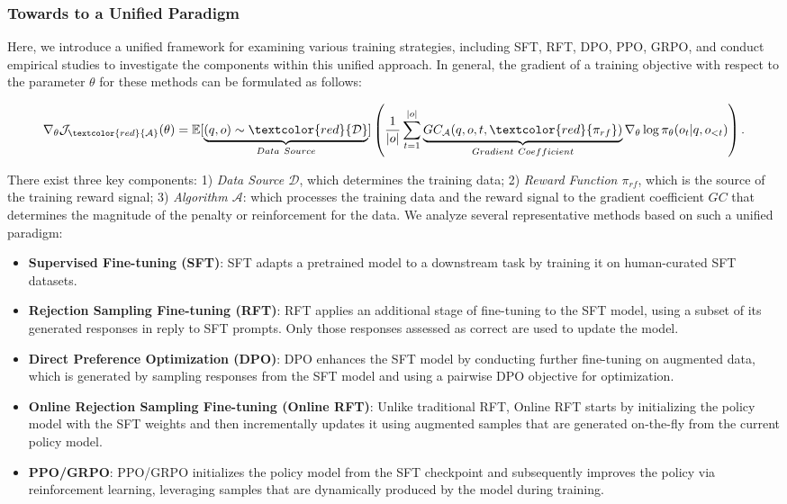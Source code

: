 \begin{itemize}[topsep=0pt]
\begin{itemize}[topsep=0pt]
\subsubsection{Towards to a Unified Paradigm} Here, we introduce a unified framework for examining various training strategies, including SFT, RFT, DPO, PPO, GRPO, and conduct empirical studies to investigate the components within this unified approach. In general, the gradient of a training objective with respect to the parameter $\theta$ for these methods can be formulated as follows:

\begin{equation}
    \nabla_{\theta}\mathcal{J}_{\textcolor{red}{\mathcal{A}}}(\theta) = \mathbb{E}[\underbrace{(q,o) \sim \textcolor{red}{\mathcal{D}}}_{Data \ Source}]\left( \frac{1}{|o|} \sum_{t=1}^{|o|}  \underbrace{GC_{{\mathcal{A}}}(q, o, t, \textcolor{red}{\pi_{{rf}}})}_{Gradient \ Coefficient}  \nabla_{\theta}\log \pi_{\theta}(o_t | q, o_{<t})\right).
\label{eq:objective}
\end{equation}

There exist three key components: 1) \textit{Data Source $\mathcal{D}$}, which determines the training data; 2) \textit{Reward Function $\pi_{{rf}}$}, which is the source of the training reward signal; 3) \textit{Algorithm $\mathcal{A}$}: which processes the training data and the reward signal to the gradient coefficient $GC$ that determines the magnitude of the penalty or reinforcement for the data. We analyze several representative methods based on such a unified paradigm:

\begin{itemize}
    \item  \textbf{Supervised Fine-tuning (SFT)}: SFT adapts a pretrained model to a downstream task by training it on human-curated SFT datasets.
    \item \textbf{Rejection Sampling Fine-tuning (RFT)}: RFT applies an additional stage of fine-tuning to the SFT model, using a subset of its generated responses in reply to SFT prompts. Only those responses assessed as correct are used to update the model.
    \item \textbf{Direct Preference Optimization (DPO)}: DPO enhances the SFT model by conducting further fine-tuning on augmented data, which is generated by sampling responses from the SFT model and using a pairwise DPO objective for optimization.
    \item \textbf{Online Rejection Sampling Fine-tuning (Online RFT)}: Unlike traditional RFT, Online RFT starts by initializing the policy model with the SFT weights and then incrementally updates it using augmented samples that are generated on-the-fly from the current policy model.
    \item \textbf{PPO/GRPO}: PPO/GRPO initializes the policy model from the SFT checkpoint and subsequently improves the policy via reinforcement learning, leveraging samples that are dynamically produced by the model during training.
\end{itemize}


\end{itemize}
\end{itemize}
